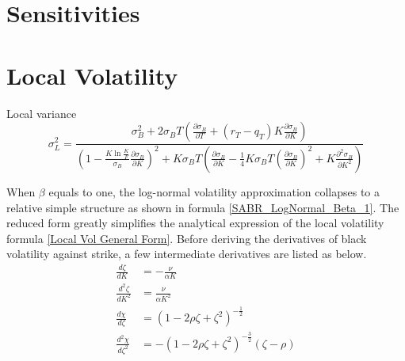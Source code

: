 \documentclass{article}
\begin{document}
\section{Sensitivities}



\section{Local Volatility}

Local variance
\begin{equation} \label{Local Vol General Form}
    \sigma_{L}^2 = \frac{\sigma_{B}^2 + 2 \sigma_{B} T \left(\frac{\partial \sigma_{B}}{\partial T} + (r_T - q_T) K \frac{\partial \sigma_{B}}{\partial K}\right)}{\left(1 - \frac{K \ln{\frac{K}{F}}}{\sigma_{B}} \frac{\partial \sigma_{B}}{\partial K}\right)^2 + K \sigma_{B} T \left(\frac{\partial \sigma_{B}}{\partial K} - \frac{1}{4} K \sigma_{B} T \left(\frac{\partial \sigma_{B}}{\partial K}\right)^2 + K \frac{\partial^2 \sigma_{B}}{\partial K^2}\right)}
\end{equation}

When $ \beta $ equals to one, the log-normal volatility approximation collapses to a relative simple structure as shown in formula \ref{SABR_LogNormal_Beta_1}.
The reduced form greatly simplifies the analytical expression of the local volatility formula \ref{Local Vol General Form}.
Before deriving the derivatives of black volatility against strike, a few intermediate derivatives are listed as below.
\begin{subequations}
    \begin{align}
        \frac{d \zeta}{d K} &= -\frac{\nu}{\alpha K} \\
        \frac{d^2 \zeta}{d K^2} &= \frac{\nu}{\alpha K^2}\\
        \frac{d \chi}{d \zeta} &= \left(1 - 2 \rho \zeta + \zeta^2\right)^{-\frac{1}{2}}\\
        \frac{d^2 \chi}{d \zeta^2} &= -\left(1 - 2 \rho \zeta + \zeta^2\right)^{-\frac{3}{2}} \left(\zeta - \rho\right)
    \end{align}
\end{subequations}
\end{document}
